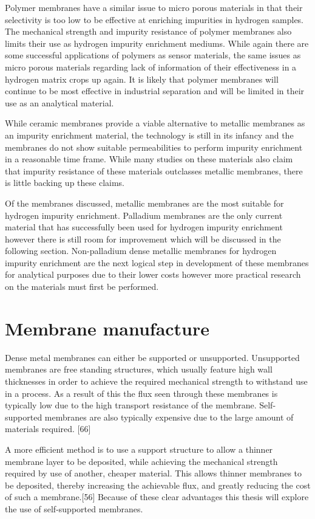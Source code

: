 Polymer membranes have a similar issue to micro porous materials in that their selectivity 
is too low to be effective at enriching impurities in hydrogen samples. The mechanical 
strength and impurity resistance of polymer membranes also limits their use as hydrogen 
impurity enrichment mediums. While again there are some successful applications of polymers 
as sensor materials, the same issues as micro porous materials regarding lack of information 
of their effectiveness in a hydrogen matrix crops up again. It is likely that polymer 
membranes will continue to be most effective in industrial separation and will be limited in 
their use as an analytical material. 

While ceramic membranes provide a viable alternative to metallic membranes as an impurity 
enrichment material, the technology is still in its infancy and the membranes do not show 
suitable permeabilities to perform impurity enrichment in a reasonable time frame. While many 
studies on these materials also claim that impurity resistance of these materials outclasses 
metallic membranes, there is little backing up these claims.  

Of the membranes discussed, metallic membranes are the most suitable for hydrogen impurity 
enrichment.  Palladium membranes are the only current material that has successfully been 
used for hydrogen impurity enrichment however there is still room for improvement which will 
be discussed in the following section. Non-palladium dense metallic membranes for hydrogen 
impurity enrichment are the next logical step in development of these membranes for 
analytical purposes due to their lower costs however more practical research on the materials 
must first be performed.

\section{Membrane manufacture}
Dense metal membranes can either be supported or unsupported. Unsupported membranes are free 
standing structures, which usually feature high wall thicknesses in order to achieve the 
required mechanical strength to withstand use in a process. As a result of this the flux 
seen through these membranes is typically low due to the high transport resistance of the 
membrane. Self-supported membranes are also typically expensive due to the large amount of 
materials required. [66]

A more efficient method is to use a support structure to allow a thinner membrane layer to 
be deposited, while achieving the mechanical strength required by use of another, cheaper 
material. This allows thinner membranes to be deposited, thereby increasing the achievable 
flux, and greatly reducing the cost of such a membrane.[56] Because of these clear advantages 
this thesis will explore the use of self-supported membranes. 


